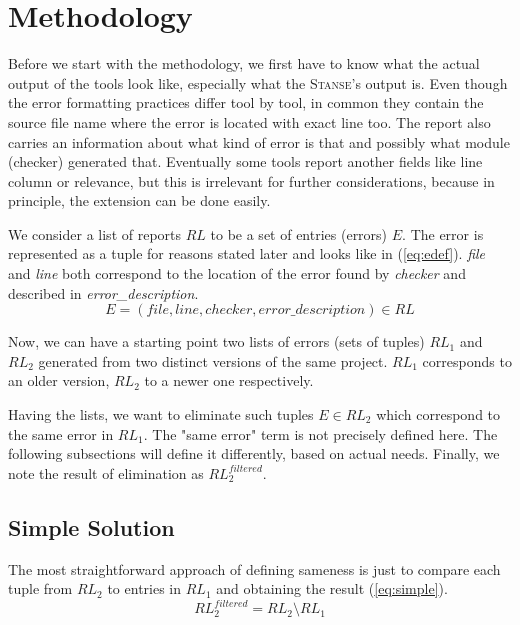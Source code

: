 \documentclass{acm_proc_article-sp}
\newcommand\st{\textsc{Stanse}\xspace}
\begin{document}
\section{Methodology}
\label{sec:method}
Before we start with the methodology, we first have to know what the actual
output of the tools look like, especially what the \st's output is. Even
though the error formatting practices differ tool by tool, in common they
contain the source file name where the error is located with exact line too.
The report also carries an information about what kind of error is that and
possibly what module (checker) generated that. Eventually some tools report
another fields like line column or relevance, but this is irrelevant for
further considerations, because in principle, the extension can be done
easily.

We consider a list of reports $RL$ to be a set of entries (errors) $E$. The
error is represented as a tuple for reasons stated later and looks like
in (\ref{eq:edef}). \textit{file} and \textit{line} both correspond to the
location of the error found by \textit{checker} and described in
\textit{error\_description}.
\begin{equation} \label{eq:edef}
E = (file, line, checker, error\_description) \in RL
\end{equation}

Now, we can have a starting point two lists of errors (sets of tuples) $RL_1$
and $RL_2$ generated from two distinct versions of the same project. $RL_1$
corresponds to an older version, $RL_2$ to a newer one respectively.

Having the lists, we want to eliminate such tuples $E \in RL_2$ which
correspond to the same error in $RL_1$. The "same error" term is not precisely
defined here. The following subsections will define it differently, based on
actual needs. Finally, we note the result of elimination as $RL^{filtered}_2$.

\subsection{Simple Solution}
\label{sec:simple}
The most straightforward approach of defining sameness is just to compare each
tuple from $RL_2$ to entries in $RL_1$ and obtaining the result
(\ref{eq:simple}).
\begin{equation} \label{eq:simple}
RL^{filtered}_2=RL_2\setminus RL_1
\end{equation}
\end{document}
